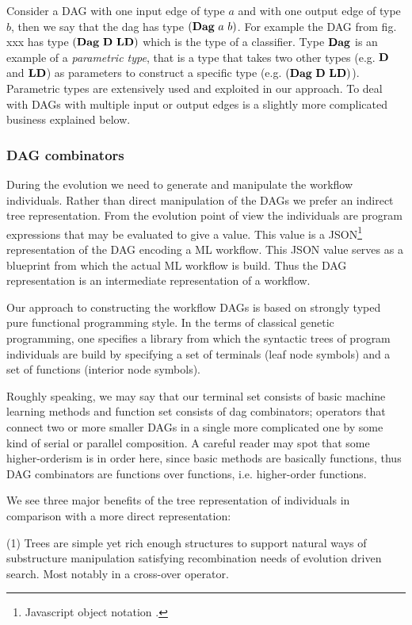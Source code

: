 \documentclass[a4paper,oneside]{memoir}
\begin{document}
Consider a DAG with one input edge of type $a$ and with one output edge of type $b$, then we say that the dag has type $(\textbf{Dag}\ a\ b)$. 
For example the DAG from fig. xxx has type $(\textbf{Dag}\ \textbf{D}\ \textbf{LD})$ which is the type of a classifier.
Type $\textbf{Dag}$ is an example of a \textit{parametric type}, that is a type that takes two other types (e.g. $\textbf{D}$ and $\textbf{LD}$) as parameters to construct a specific type (e.g. $(\textbf{Dag}\ \textbf{D}\ \textbf{LD})$).
Parametric types are extensively used and exploited in our approach.
To deal with DAGs with multiple input or output edges is a slightly more complicated business explained below.

\subsubsection{DAG combinators}

During the evolution we need to generate and manipulate the workflow individuals. Rather than direct manipulation of the DAGs we prefer an indirect tree representation. From the evolution point of view the individuals are program expressions that may be  evaluated to give a value. This value is a JSON\footnote{Javascript object notation .} representation of the DAG encoding a ML workflow. This JSON value serves as a blueprint from which the actual ML workflow is build. Thus the DAG representation is an intermediate representation of a workflow.

Our approach to constructing the workflow DAGs is based on strongly typed pure functional programming style. In the terms of classical genetic programming, one specifies a library from which the syntactic trees of program individuals are build by specifying a set of terminals (leaf node symbols) and a set of functions (interior node symbols). 

Roughly speaking, we may say that our terminal set consists of basic machine learning methods and function set consists of dag combinators; operators that connect two or more smaller DAGs in a single more complicated one by some kind of serial or parallel composition. A careful reader may spot that some higher-orderism is in order here, since basic methods are basically functions, thus DAG combinators are functions over functions, i.e. higher-order functions.

We see three major benefits of the tree representation of individuals in comparison with a more direct representation:

(1) Trees are simple yet rich enough structures to support natural ways of substructure manipulation satisfying recombination needs of evolution driven search. Most notably in a cross-over operator. 
\end{document}
